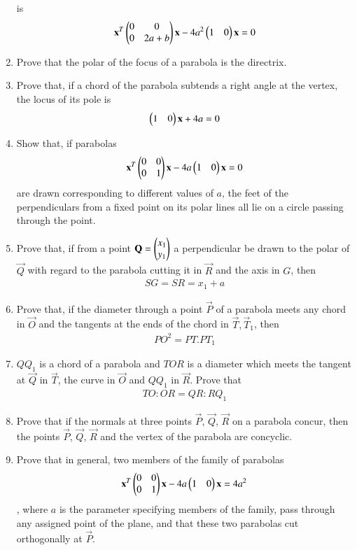 \begin{enumerate}[label=\arabic*.,ref=\thesubsection.\theenumi]
is
\begin{align}
\mathbf{x}^T\begin{pmatrix}0 & 0\\0 & 2a+b\end{pmatrix}\mathbf{x}-4a^2\begin{pmatrix}1 & 0 \end{pmatrix}\mathbf{x}= 0 
\end{align}
\item Prove that the polar of the focus of a parabola is the directrix.
\item Prove that, if a chord of the parabola subtends a right angle at the vertex, the locus of its pole is 
\begin{align}
\begin{pmatrix}1 & 0\end{pmatrix}\mathbf{x} + 4a= 0 
\end{align}
\item Show that, if parabolas 
\begin{align}
\mathbf{x}^T\begin{pmatrix}0 & 0\\0 & 1\end{pmatrix}\mathbf{x}-4a\begin{pmatrix}1 & 0 \end{pmatrix}\mathbf{x}= 0 
\end{align}
 are drawn corresponding to different values of $a$, the feet of the perpendiculars
from a fixed point on its polar lines all lie on a circle passing through the point.
\item Prove that, if from a point $\mathbf{Q}= \begin{pmatrix}x_1\\y_1\end{pmatrix}$ a perpendicular be drawn to the polar
of $\vec{Q}$ with regard to the parabola cutting it in $\vec{R}$ and the axis in $G$, then
\begin{align}
SG=SR=x_1+a
\end{align}
\item Prove that, if the diameter through a point $\vec{P}$ of a parabola meets any chord in $\vec{O}$ and the tangents at the
ends of the chord in $\vec{T}, \vec{T}_1$, then
\begin{align}
PO^2=PT.PT_1
\end{align}
\item $QQ_1$ is a chord of a parabola and $TOR$ is a diameter which meets the tangent at $\vec{Q}$ in $\vec{T}$, the curve in $\vec{O}$ and $QQ_1$ in $\vec{R}$.  Prove
that 
\begin{align}
TO:OR=QR:RQ_1
\end{align}
\item Prove that if the normals at three points $\vec{P}$, $\vec{Q}$, $\vec{R}$ on a parabola concur, then the points $\vec{P}$, $\vec{Q}$, $\vec{R}$ and the vertex of
the parabola are concyclic.
\item Prove that in general, two members of the family of parabolas 
\begin{align}
\mathbf{x}^T\begin{pmatrix}0 & 0\\0 & 1\end{pmatrix}\mathbf{x}-4a\begin{pmatrix}1 & 0 \end{pmatrix}\mathbf{x}= 4a^2 
\end{align}
, where $a$ is the parameter specifying members
of the family, pass through any assigned point of the plane, and that these two parabolas cut orthogonally at $\vec{P}$.
\end{enumerate}

